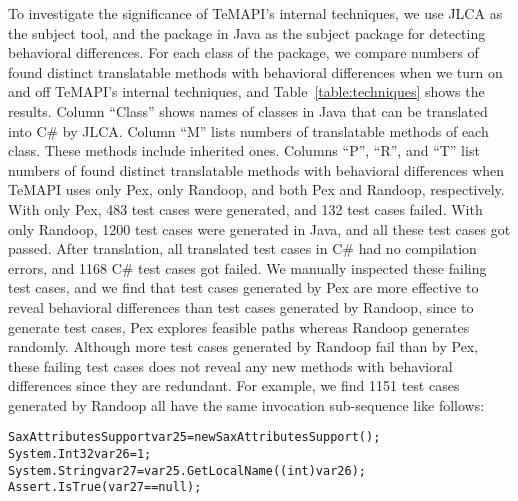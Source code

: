 To investigate the significance of TeMAPI's internal techniques, we use JLCA as the subject tool, and the  package in Java as the subject package for detecting behavioral differences. For each class of the package, we compare numbers of found distinct translatable methods with behavioral differences when we turn on and off TeMAPI's internal techniques, and Table~\ref{table:techniques} shows the results. Column ``Class'' shows names of classes in Java that can be translated into C\# by JLCA. Column ``M'' lists numbers of translatable methods of each class. These methods include inherited ones. Columns ``P'', ``R'', and ``T'' list numbers of found distinct translatable methods with behavioral differences when TeMAPI uses only Pex, only Randoop, and both Pex and Randoop, respectively. With only Pex, 483 test cases were generated, and 132 test cases failed. With only Randoop, 1200 test cases were generated in Java, and all these test cases got passed. After translation, all translated test cases in C\# had no compilation errors, and 1168 C\# test cases got failed. We manually inspected these failing test cases, and we find that test cases generated by Pex are more effective to reveal behavioral differences than test cases generated by Randoop, since to generate test cases, Pex explores feasible paths whereas Randoop generates randomly. Although more test cases generated by Randoop fail than by Pex, these failing test cases does not reveal any new methods with behavioral differences since they are redundant. For example, we find 1151 test cases generated by Randoop all have the same invocation sub-sequence like follows:

\begin{CodeOut}\vspace*{-1.5ex}
\begin{alltt}
SaxAttributesSupport var25 = new SaxAttributesSupport();
System.Int32 var26 = 1;
System.String var27 = var25.GetLocalName((int) var26);
Assert.IsTrue(var27 == null);
\end{alltt}
\end{CodeOut}\vspace*{-1.5ex}


